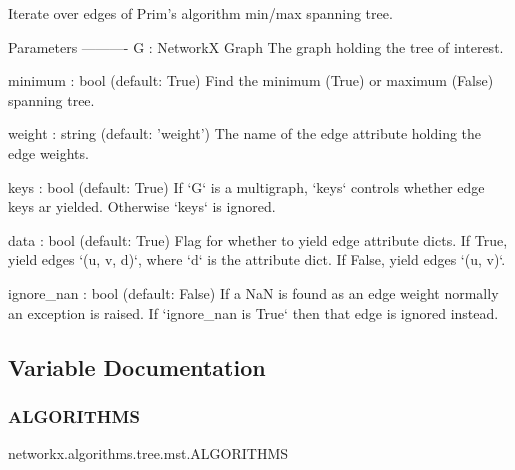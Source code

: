 \begin{DoxyVerb}Iterate over edges of Prim's algorithm min/max spanning tree.

Parameters
----------
G : NetworkX Graph
    The graph holding the tree of interest.

minimum : bool (default: True)
    Find the minimum (True) or maximum (False) spanning tree.

weight : string (default: 'weight')
    The name of the edge attribute holding the edge weights.

keys : bool (default: True)
    If `G` is a multigraph, `keys` controls whether edge keys ar yielded.
    Otherwise `keys` is ignored.

data : bool (default: True)
    Flag for whether to yield edge attribute dicts.
    If True, yield edges `(u, v, d)`, where `d` is the attribute dict.
    If False, yield edges `(u, v)`.

ignore_nan : bool (default: False)
    If a NaN is found as an edge weight normally an exception is raised.
    If `ignore_nan is True` then that edge is ignored instead.\end{DoxyVerb}
 

\subsection{Variable Documentation}
\mbox{\label{namespacenetworkx_1_1algorithms_1_1tree_1_1mst_a96a659ccaadb2fb6d06e9c3e7e702cec}} 
\subsubsection{\texorpdfstring{A\+L\+G\+O\+R\+I\+T\+H\+MS}{ALGORITHMS}}
{\footnotesize\ttfamily networkx.\+algorithms.\+tree.\+mst.\+A\+L\+G\+O\+R\+I\+T\+H\+MS}

